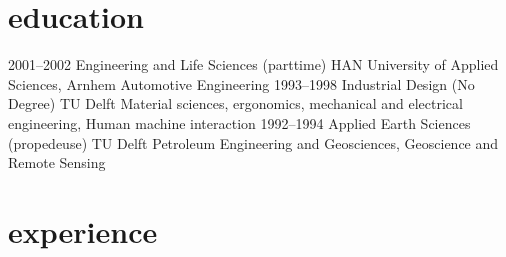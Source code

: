 \documentclass[print]{friggeri-cv} %
\begin{document}

\section{education}

\begin{entrylist}
\entry
{2001--2002}
{Engineering and Life Sciences {\normalfont (parttime)}}
{HAN University of Applied Sciences, Arnhem}
{Automotive Engineering}
\entry
{1993--1998}
{Industrial Design {\normalfont (No Degree)}}
{TU Delft}
{Material sciences, ergonomics, mechanical and electrical engineering, Human machine interaction}
\entry
{1992--1994}
{Applied Earth Sciences {\normalfont (propedeuse)}}
{TU Delft}
{Petroleum Engineering and Geosciences, Geoscience and Remote Sensing}
\end{entrylist}


\section{experience}
\end{document}
